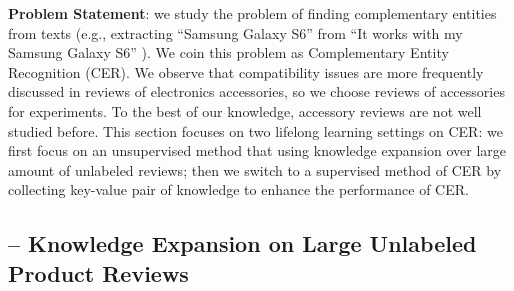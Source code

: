 \textbf{Problem Statement}: we study the problem of finding complementary entities from texts (e.g., extracting ``Samsung Galaxy S6'' from ``It works with my Samsung Galaxy S6'' ). We coin this problem as Complementary Entity Recognition (CER). We observe that compatibility issues are more frequently discussed in reviews of electronics accessories, so we choose reviews of accessories for experiments. To the best of our knowledge, accessory reviews are not well studied before.
This section focuses on two lifelong learning settings on CER: we first focus on an unsupervised method that using knowledge expansion over large amount of unlabeled reviews; then we switch to a supervised method of CER by collecting key-value pair of knowledge to enhance the performance of CER.

\subsection{-- Knowledge Expansion on Large Unlabeled Product Reviews}


